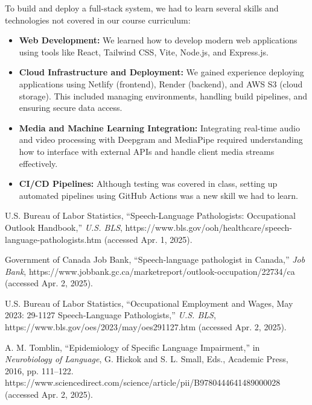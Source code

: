 \documentclass{article}
\begin{document}
To build and deploy a full-stack system, we had to learn several skills and technologies not covered in our course curriculum:

\begin{itemize}
    \item \textbf{Web Development:} We learned how to develop modern web applications using tools like React, Tailwind CSS, Vite, Node.js, and Express.js.
    
    \item \textbf{Cloud Infrastructure and Deployment:} We gained experience deploying applications using Netlify (frontend), Render (backend), and AWS S3 (cloud storage). 
    This included managing environments, handling build pipelines, and ensuring secure data access.
    
    \item \textbf{Media and Machine Learning Integration:} Integrating real-time audio and video processing with Deepgram and MediaPipe required understanding how to interface with external APIs and handle client media streams effectively.
    
    \item \textbf{CI/CD Pipelines:} Although testing was covered in class, setting up automated pipelines using GitHub Actions was a new skill we had to learn.
\end{itemize}

\begin{thebibliography}{4}

    U.S. Bureau of Labor Statistics, “Speech-Language Pathologists: Occupational Outlook Handbook,” \textit{U.S. BLS}, https://www.bls.gov/ooh/healthcare/speech-language-pathologists.htm (accessed Apr. 1, 2025).
 
    Government of Canada Job Bank, “Speech-language pathologist in Canada,” \textit{Job Bank}, https://www.jobbank.gc.ca/marketreport/outlook-occupation/22734/ca (accessed Apr. 2, 2025).

    U.S. Bureau of Labor Statistics, “Occupational Employment and Wages, May 2023: 29-1127 Speech-Language Pathologists,” \textit{U.S. BLS}, https://www.bls.gov/oes/2023/may/oes291127.htm (accessed Apr. 2, 2025).

    A. M. Tomblin, “Epidemiology of Specific Language Impairment,” in \textit{Neurobiology of Language}, G. Hickok and S. L. Small, Eds., Academic Press, 2016, pp. 111–122. https://www.sciencedirect.com/science/article/pii/B9780444641489000028 (accessed Apr. 2, 2025).

\end{thebibliography}
\end{document}
